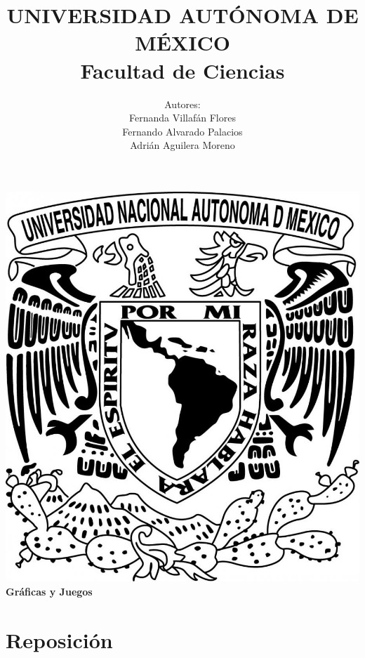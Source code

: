 \documentclass{article}
\begin{document}
\title{UNIVERSIDAD AUT\'ONOMA DE M\'EXICO\\ Facultad de Ciencias}
\author{Autores:
  \\ Fernanda Villaf\'an Flores
  \\ Fernando Alvarado Palacios
  \\ Adri\'an Aguilera Moreno}
\date{}
\maketitle
\begin{center}
  \includegraphics[scale=0.20]{../Imagen/Portada.jpg}\\[0.4cm]
  \Large
  \bf{Gr\'aficas y Juegos}
  \normalsize
\end{center}
\newpage
{}
\section*{\LARGE{Reposición}}
\end{document}
